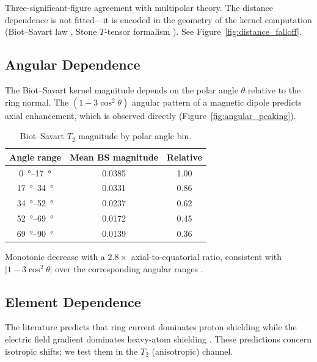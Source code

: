 Three-significant-figure agreement with multipolar theory.  The
distance dependence is not fitted---it is encoded in the geometry of
the kernel computation (Biot--Savart law \cite{johnson1958},
Stone $T$-tensor formalism \cite{stone2013}).
See Figure~\ref{fig:distance_falloff}.


\subsection{Angular Dependence}
\label{ssec:angular}

The Biot--Savart kernel magnitude depends on the polar angle $\theta$
relative to the ring normal.  The $(1 - 3\cos^2\theta)$ angular pattern
of a magnetic dipole \cite{pople1956} predicts axial enhancement, which
is observed directly (Figure~\ref{fig:angular_peaking}).

\begin{table}[htbp]
  \centering
  \caption{Biot--Savart $T_2$ magnitude by polar angle bin.}
  \label{tab:angular-bins}
  \begin{tabular}{ccc}
    \toprule
    Angle range & Mean BS magnitude & Relative \\
    \midrule
    \SIrange{0}{17}{\degree}  & 0.0385 & 1.00 \\
    \SIrange{17}{34}{\degree} & 0.0331 & 0.86 \\
    \SIrange{34}{52}{\degree} & 0.0237 & 0.62 \\
    \SIrange{52}{69}{\degree} & 0.0172 & 0.45 \\
    \SIrange{69}{90}{\degree} & 0.0139 & 0.36 \\
    \bottomrule
  \end{tabular}
\end{table}

Monotonic decrease with a $2.8\times$ axial-to-equatorial ratio,
consistent with $\lvert 1 - 3\cos^2\theta \rvert$ over the
corresponding angular ranges \cite{case1995}.


\subsection{Element Dependence}
\label{ssec:element}

The literature predicts that ring current dominates proton shielding
\cite{boyd2002} while the electric field gradient dominates heavy-atom
shielding \cite{sahakyan2013}.  These predictions concern isotropic
shifts; we test them in the $T_2$ (anisotropic) channel.

